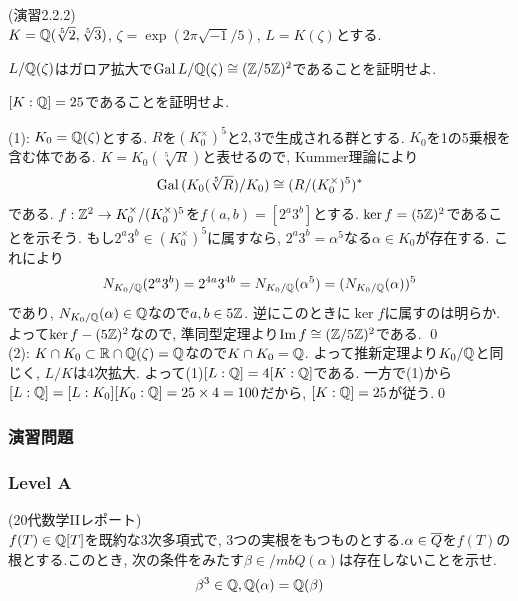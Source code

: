 \begin{egprob} (\cite{momoyukie}演習2.2.2)\\
$K=\mathbb{Q}(\sqrt[5]{2},\sqrt[5]{3})$, $\zeta = \exp{(2\pi \sqrt{-1}/5)}$, $L=K(\zeta)$とする.
\ben
\item $L/\mathbb{Q}(\zeta)$はガロア拡大で$\operatorname{Gal}{L/\mathbb{Q}(\zeta)} \cong (\mathbb{Z}/5\mathbb{Z})^2$であることを証明せよ.
\item $[K:\mathbb{Q}] = 25$であることを証明せよ.
\een
\end{egprob}
\begin{egans}
(1): $K_0 = \mathbb{Q}(\zeta)$とする. $R$を$(K_0^{\times})^5$と$2,3$で生成される群とする. $K_0$を1の5乗根を含む体である. $K=K_0(\sqrt[5]{R})$と表せるので, Kummer理論により
\[\operatorname{Gal}{(K_0(\sqrt[5]{R})/K_0)} \cong (R/(K_0^{\times})^5)^{\ast}\]
である. $f:\mathbb{Z}^2 \to K_0^{\times}/(K_0^{\times})^5$を$f(a,b) = [2^a3^b]$とする. $\ker{f} = (5\mathbb{Z})^2$であることを示そう. もし$2^a3^b\in (K_0^{\times})^5$に属すなら, $2^a3^b = \alpha^5$なる$\alpha\in K_0$が存在する. これにより
\[N_{K_0/\mathbb{Q}}(2^a3^b)= 2^{4a}3^{4b} = N_{K_0/\mathbb{Q}}(\alpha^5) = (N_{K_0/\mathbb{Q}}(\alpha))^5 \]
であり, $N_{K_0/\mathbb{Q}}(\alpha) \in \mathbb{Q}$なので$a,b\in 5\mathbb{Z}$. 逆にこのときに$\ker{f}$に属すのは明らか. よって$\ker{f} - (5\mathbb{Z})^2$なので, 準同型定理より$\mathrm{Im}\,f \cong (\mathbb{Z}/5\mathbb{Z})^{2}$である. \qed \\
(2): $K\cap K_0 \subset \mathbb{R} \cap \mathbb{Q}(\zeta) = \mathbb{Q}$なので$K\cap K_0 = \mathbb{Q}$. よって推新定理より$K_0/\mathbb{Q}$と同じく, $L/K$は4次拡大. よって(1)$[L:\mathbb{Q}] = 4[K:\mathbb{Q}]$である. 一方で(1)から$[L:\mathbb{Q}] = [L:K_0][K_0:\mathbb{Q}] = 25\times 4  =100$だから, $[K:\mathbb{Q}] = 25$が従う.\qed
\end{egans}





\newpage


\subsubsection{演習問題}
\subsubsection{Level A}
\begin{prob} (20代数学IIレポート)\\
$f(T)\in \mathbb{Q}[T]$を既約な3次多項式で, 3つの実根をもつものとする.$\alpha\in \overline{Q}$を$f(T)$の根とする.このとき, 次の条件をみたす$\beta\in /mb{Q}(\alpha)$は存在しないことを示せ.
\[\beta^{3}\in \mathbb{Q}, \mathbb{Q}(\alpha) = \mathbb{Q}(\beta)\]
\end{prob}

